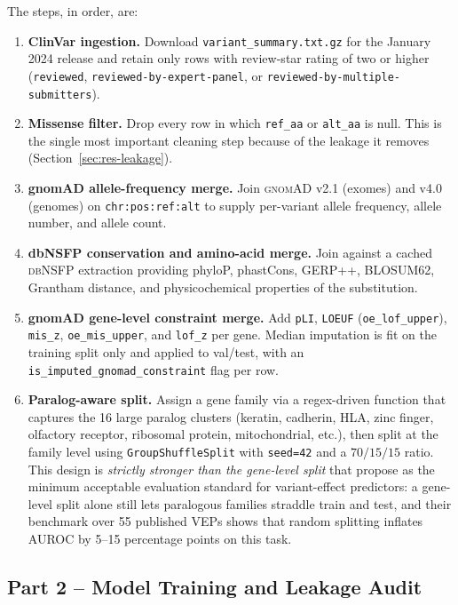 \documentclass[11pt,a4paper,oneside]{report}
\begin{document}
The steps, in order, are:

\begin{enumerate}
\item \textbf{ClinVar ingestion.} Download
\texttt{variant\_summary.txt.gz} for the January 2024
release and retain only rows with review-star rating of
two or higher (\texttt{reviewed}, \texttt{reviewed-by-expert-panel},
or \texttt{reviewed-by-multiple-submitters}).
\item \textbf{Missense filter.} Drop every row in which
\texttt{ref\_aa} or \texttt{alt\_aa} is null. This is the
single most important cleaning step because of the
leakage it removes (Section~\ref{sec:res-leakage}).
\item \textbf{gnomAD allele-frequency merge.} Join
\textsc{gnomAD} v2.1 (exomes) and v4.0 (genomes) on
\texttt{chr:pos:ref:alt} to supply per-variant allele
frequency, allele number, and allele count.
\item \textbf{dbNSFP conservation and amino-acid merge.}
Join against a cached \textsc{dbNSFP} extraction
providing phyloP, phastCons, GERP++, BLOSUM62, Grantham
distance, and physicochemical properties of the
substitution.
\item \textbf{gnomAD gene-level constraint merge.} Add
\texttt{pLI}, \texttt{LOEUF} (\texttt{oe\_lof\_upper}),
\texttt{mis\_z}, \texttt{oe\_mis\_upper}, and
\texttt{lof\_z} per gene. Median imputation is fit on the
training split only and applied to val/test, with an
\texttt{is\_imputed\_gnomad\_constraint} flag per row.
\item \textbf{Paralog-aware split.} Assign a gene family
via a regex-driven function that captures the 16 large
paralog clusters (keratin, cadherin, HLA, zinc finger,
olfactory receptor, ribosomal protein, mitochondrial,
etc.), then split at the family level using
\texttt{GroupShuffleSplit} with \texttt{seed=42} and a
$70/15/15$ ratio. This design is \emph{strictly stronger
than the gene-level split} that \citet{heijl2020gap}
propose as the minimum acceptable evaluation standard
for variant-effect predictors: a gene-level split alone
still lets paralogous families straddle train and test,
and their benchmark over 55 published VEPs shows that
random splitting inflates AUROC by 5--15 percentage
points on this task.
\end{enumerate}

\subsection{Part 2 -- Model Training and Leakage Audit}
\label{sec:fw-part2}
\end{document}
